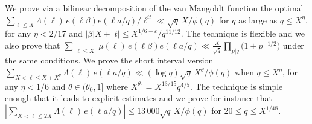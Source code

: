 \documentclass[12pt,a4paper,twoside]{article}
\begin{document}
We prove via a bilinear decomposition of the van Mangoldt function the optimal
  $\sum_{\ell\le X}\Lambda(\ell)\, e(\ell\beta)e(\ell a/q)/\ell^{it} \ll
  \sqrt{q}\,X/\phi(q)$ for $q$ as large as $q\le X^{\eta}$, for any
  $\eta<2/17$ and $|\beta|X+|t|\le X^{1/6-\varepsilon}/q^{11/12}$. The technique is
  flexible and we also prove that
    $\sum_{\substack{\ell\le X}}\mu(\ell)\, e(\ell \beta)e(\ell a/q)
    \ll \frac{X}{\sqrt{q}}\prod_{p|q}\bigl(1+p^{-1/2}\bigr)$ under the same
    conditions.
    We prove the short interval version $\sum_{X<\ell\le
      X+X^\theta}\Lambda(\ell)\, e(\ell a/q) 
    \ll (\log q)\sqrt{q}\,X^\theta/\phi(q)$ when $q\le X^{\eta}$, for any
    $\eta<1/6$ and $\theta\in(\theta_0,1]$ where
    $X^{\theta_0}=X^{13/15}q^{4/5}$. The technique is simple enough that
    it leads to explicit estimates and we prove for instance that $|
    \sum_{X<\ell\le 2X}\Lambda(\ell)\, e(\ell a/q)
    |\le13\,000 \sqrt{q}\,X/\phi(q)$ for $20\le q\le X^{1/48}$. 
\end{document}
